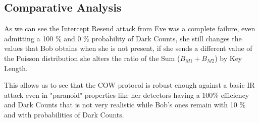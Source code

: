 \begin{refsection}
\subsection{Comparative Analysis}

As we can see the Intercept Resend attack from Eve was a complete failure, even admitting a 100 \% and 0 \% probability of Dark Counts, she still changes the values that Bob obtains when she is not present, if she sends a different value of the Poisson distribution she alters the ratio of the Sum ($B_{M1}+B_{M2}$) by Key Length.

This allows us to see that the COW protocol is robust enough against a basic IR attack even in "paranoid" properties like her detectors having a 100\% efficiency and Dark Counts that is not very realistic while Bob's ones remain with 10 \% and with probabilities of Dark Counts.


\clearpage
\printbibliography[heading=subbibliography]
\end{refsection}
\cleardoublepage
